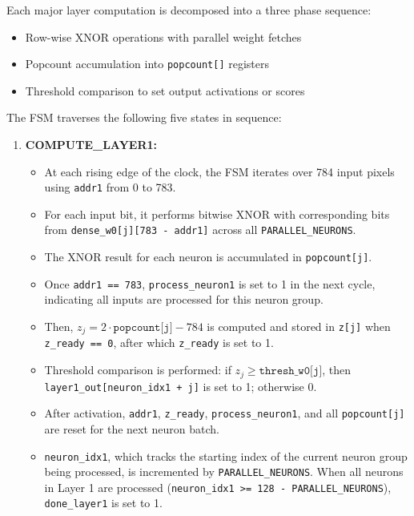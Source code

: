 \documentclass[a4paper,12pt]{report}
\begin{document}
Each major layer computation is decomposed into a three phase sequence:
\vspace{-2em}
\begin{itemize}
    \item Row-wise XNOR operations with parallel weight fetches
    \item Popcount accumulation into \texttt{popcount[]} registers
    \item Threshold comparison to set output activations or scores
\end{itemize}
\vspace{-2em}
The FSM traverses the following five states in sequence:
\begin{enumerate}
    \item \textbf{COMPUTE\_LAYER1:}
    \begin{itemize}
        \item At each rising edge of the clock, the FSM iterates over 784 input pixels using \texttt{addr1} from 0 to 783.
        \item For each input bit, it performs bitwise XNOR with corresponding bits from \newline \texttt{dense\_w0[j][783 - addr1]} across all \texttt{PARALLEL\_NEURONS}.
        \item The XNOR result for each neuron is accumulated in \texttt{popcount[j]}.
        \item Once \texttt{addr1 == 783}, \texttt{process\_neuron1} is set to 1 in the next cycle, indicating all inputs are processed for this neuron group.
        \item Then, $z_j = 2 \cdot \texttt{popcount[j]} - 784$ is computed and stored in \texttt{z[j]} when \texttt{z\_ready == 0}, after which \texttt{z\_ready} is set to 1.
        \item Threshold comparison is performed: if $z_j \geq \texttt{thresh\_w0[j]}$, then \newline \texttt{layer1\_out[neuron\_idx1 + j]} is set to 1; otherwise 0.
        \item After activation, \texttt{addr1}, \texttt{z\_ready}, \texttt{process\_neuron1}, and all \texttt{popcount[j]} are reset for the next neuron batch.
        \item \texttt{neuron\_idx1}, which tracks the starting index of the current neuron group being processed, is incremented by \texttt{PARALLEL\_NEURONS}. When all neurons in Layer 1 are processed (\texttt{neuron\_idx1 >= 128 - PARALLEL\_NEURONS}), \texttt{done\_layer1} is set to 1.
    \end{itemize}


\end{enumerate}
\end{document}
